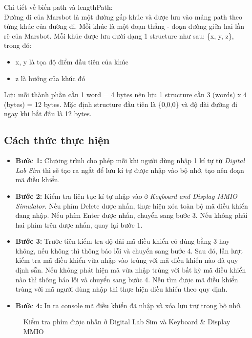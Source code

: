 \documentclass[a4paper,12pt]{article}
\begin{document}
	    Chi tiết về biến path và lengthPath: \\
	    Đường đi của Marsbot là một đường gấp khúc và được lưu vào mảng path theo từng khúc của đường đi. Mỗi khúc là một đoạn thẳng - đoạn đường giữa hai lần rẽ của Marsbot. Mỗi khúc được lưu dưới dạng 1 structure như sau: \{x, y, z\}, trong đó: 	
	    \begin{itemize}
	        \item x, y là tọa độ điểm đầu tiên của khúc
	        \item z là hướng của khúc đó
	    \end{itemize}
	    Lưu mỗi thành phần cần 1 word = 4 bytes nên lưu 1 structure cần 3 (words) x 4 (bytes) = 12 bytes. Mặc định structure đầu tiên là \{0,0,0\} và độ dài đường đi ngay khi bắt đầu là 12 bytes.
	\subsection{Cách thức thực hiện}
	    \begin{itemize}
	    	\item \textbf{Bước 1:} Chương trình cho phép mỗi khi người dùng nhập 1 kí tự từ \textit{Digital Lab Sim} thì sẽ tạo ra ngắt để lưu kí tự được nhập vào bộ nhớ, tạo nên đoạn mã điều khiển.
	    	\item \textbf{Bước 2:} Kiểm tra liên tục kí tự nhập vào ở \textit{Keyboard and Display MMIO Simulator}. Nếu phím Delete được nhấn, thực hiện xóa toàn bộ mã điều khiển đang nhập. Nếu phím Enter được nhấn, chuyển sang bước 3. Nếu không phải hai phím trên được nhấn, quay lại bước 1.
	    	\item \textbf{Bước 3:} Trước tiên kiểm tra độ dài mã điều khiển có đúng bằng 3 hay không, nếu không thì thông báo lỗi và chuyển sang bước 4. Sau đó, lần lượt kiểm tra mã điều khiển vừa nhập vào trùng với mã điều khiển nào đã quy định sẵn. Nếu không phát hiện mã vừa nhập trùng với bất kỳ mã điều khiển nào thì thông báo lỗi và chuyển sang bước 4. Nếu tìm được mã điều khiển trùng với mã người dùng nhập thì thực hiện điều khiển theo quy định.
    		\item \textbf{Bước 4:} In ra console mã điều khiển đã nhập và xóa lưu trữ trong bộ nhớ.
	    \end{itemize}
	    \FloatBarrier
        \begin{figure}[ht!]
    	    \centerline{}
    	    \caption{Kiểm tra phím được nhấn ở Digital Lab Sim và Keyboard \& Display MMIO}
    	    \label{fig:bai100}
        \end{figure}
\end{document}
